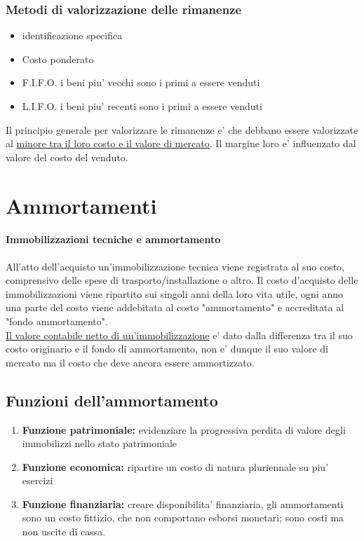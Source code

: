 \documentclass{report}
\begin{document}
	\subsubsection{Metodi di valorizzazione delle rimanenze}
	\begin{itemize}
		\item identificazione specifica
		\item Costo ponderato
		\item F.I.F.O. i beni piu' vecchi sono i primi a essere venduti
		\item L.I.F.O. i beni piu' recenti sono i primi a essere venduti
	\end{itemize}
	Il principio generale per valorizzare le rimanenze e' che debbano essere valorizzate al \underline{minore tra il loro costo e il valore di mercato}. Il margine loro e' influenzato dal valore del costo del venduto.
	\section{Ammortamenti}
	\paragraph{Immobilizzazioni tecniche e ammortamento}
	All'atto dell'acquisto un'immobilizzazione tecnica viene registrata al suo costo, comprensivo delle spese di trasporto/installazione o altro. Il costo d'acquisto delle immobilizzazioni viene ripartito sui singoli anni della loro vita utile, ogni anno una parte del costo viene addebitata al costo "ammortamento" e accreditata al "fondo ammortamento".
	\medskip \\\underline{Il valore contabile netto di un'immobilizzazione} e' dato dalla differenza tra il suo costo originario e il fondo di ammortamento, non e' dunque il suo valore di mercato ma il costo che deve ancora essere ammortizzato.
	\subsection{Funzioni dell'ammortamento}
	\begin{enumerate}
		\item \textbf{Funzione patrimoniale:} evidenziare la progressiva perdita di valore degli immobilizzi nello stato patrimoniale
		\item \textbf{Funzione economica:} ripartire un costo di natura pluriennale su piu' esercizi
		\item \textbf{Funzione finanziaria:} creare disponibilita' finanziaria, gli ammortamenti sono un costo fittizio, che non comportano esborsi monetari; sono costi ma non uscite di cassa.
	\end{enumerate}
\end{document}
